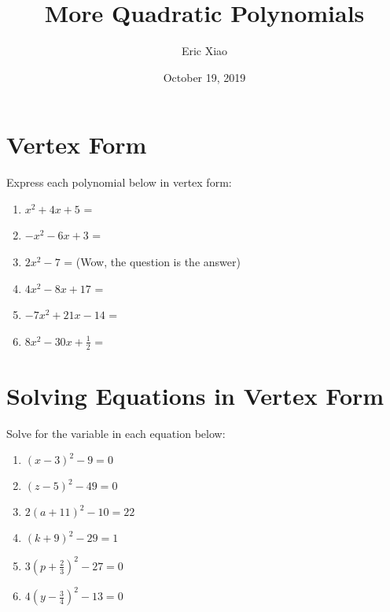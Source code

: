 \documentclass[14pt]{extarticle}
\title{\textbf{More Quadratic Polynomials}}
\author{Eric Xiao}
\date{October 19, 2019}
\begin{document}
\maketitle

\section{Vertex Form}
{Express each polynomial below in vertex form:}
\begin{enumerate}
    \item {$x^2 + 4x + 5$ = }
    \item {$-x^2 - 6x + 3$ = }
    \item {$2x^2 - 7$ =  (Wow, the question is the answer)}
    \item {$4x^2 - 8x + 17$ = }
    \item {$-7x^2 + 21x - 14$ = }
    \item {$8x^2 - 30x + \frac{1}{2}$ = }
\end{enumerate}

\section{Solving Equations in Vertex Form}
{Solve for the variable in each equation below:}
\begin{enumerate}
    \item {$(x - 3)^2 - 9 = 0$ }
    \item {$(z - 5)^2 - 49 = 0$ }
    \item {$2(a + 11)^2 - 10 = 22$ }
    \item {$(k + 9)^2 - 29 = 1$ }
    \item {$3(p + \frac{2}{3})^2 - 27 = 0$ }
    \item {$4(y - \frac{3}{4})^2 - 13 = 0$ }
\end{enumerate}
\end{document}
